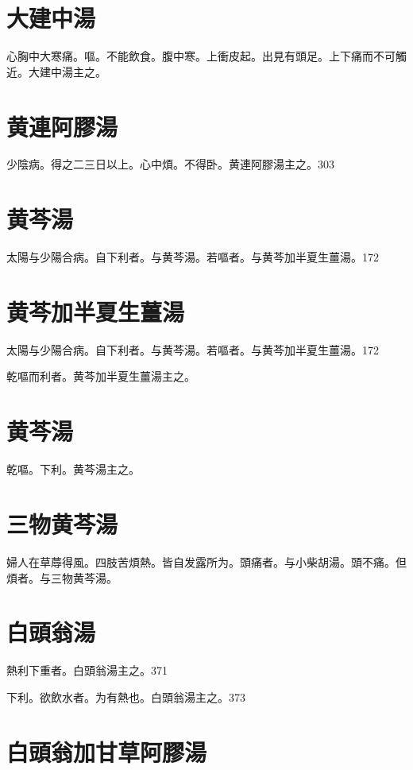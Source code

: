 \section{大建中湯}

心胸中大寒痛。嘔。不能飲食。腹中寒。上衝皮起。出見有頭足。上下痛而不可觸近。大建中湯主之。

\section{黄連阿膠湯}

少陰病。得之二三日以上。心中煩。不得卧。黄連阿膠湯主之。303

\section{黄芩湯}

太陽与少陽合病。自下利者。与黄芩湯。若嘔者。与黄芩加半夏生薑湯。172

\section{黄芩加半夏生薑湯}

太陽与少陽合病。自下利者。与黄芩湯。若嘔者。与黄芩加半夏生薑湯。172

乾嘔而利者。黄芩加半夏生薑湯主之。

\section{黄芩湯}

乾嘔。下利。黄芩湯主之。

\section{三物黄芩湯}

婦人在草蓐得風。四肢苦煩熱。皆自发露所为。頭痛者。与小柴胡湯。頭不痛。但煩者。与三物黄芩湯。

\section{白頭翁湯}

熱利下重者。白頭翁湯主之。371

下利。欲飲水者。为有熱也。白頭翁湯主之。373

\section{白頭翁加甘草阿膠湯}

